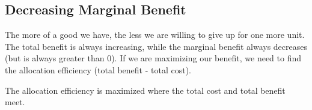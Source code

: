 \documentclass[letterpaper, 12pt]{article}
\begin{document}
\subsection{Decreasing Marginal Benefit}
The more of a good we have, the less we are willing to give up for one more
unit. The total benefit is always increasing, while the marginal benefit always
decreases (but is always greater than 0). If we are maximizing our benefit,
we need to find the allocation efficiency (total benefit - total cost).
\begin{center}
\end{center}
The allocation efficiency is maximized where the total cost and total benefit
meet.
\end{document}
